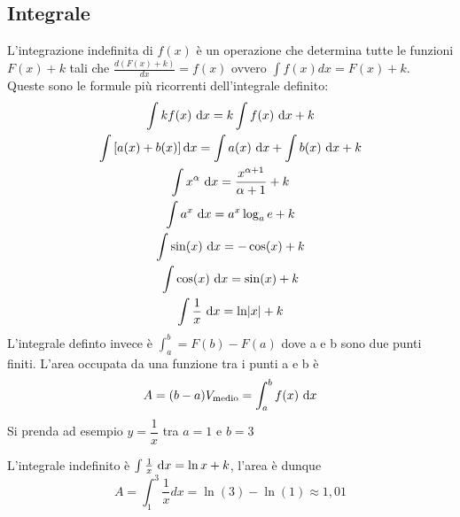 \subsection{Integrale}
L'integrazione indefinita di $f(x)$ è  un operazione che determina tutte le funzioni $F(x)+k$ tali 
che $\frac{d(F(x)+k)}{dx}=f(x)$ ovvero $\int f(x)dx = F(x)+k$.\\
Queste sono le formule più ricorrenti dell'integrale definito: 
\begin{gather*}
  \int kf(x)\,\dif x=k \int f(x)\,\dif x+k\\ 
  \int\left[a(x)+b(x)\right] \dif x= \int a(x)\,\dif x + \int b(x)\,\dif x+k\\
  \int x^{\alpha}\,\dif x =\frac{x^{\alpha+1}}{\alpha+1}+k \\
  \int a^{x}\,\dif x=a^{x}\log_{a}e+k\\
  \int \sin(x)\,\dif x = -\cos(x)+k\\
  \int \cos(x)\,\dif x = \sin(x)+k\\
  \int \frac{1}{x}\,\dif x= \ln \abs{x}+k 
\end{gather*}
L'integrale definto invece è $\int_{a}^{b}=F(b)-F(a)$ dove a e b sono due punti finiti. 
L'area occupata da una funzione tra i punti a e b è 
\begin{equation*}
  A=(b-a)V_{\text{medio}}=\int_{a}^{b}f(x)\,\mathop{}\!\mathrm{d} x
\end{equation*}
Si prenda ad esempio $y=\dfrac{1}{x}$ tra $a=1$ e $b=3$ 
\begin{center}
\end{center}
L'integrale indefinito è $\int \frac{1}{x}\,\mathop{}\!\mathrm{d} x=\ln x+k$, l'area è dunque 
\begin{equation*}
  A=\int_{1}^{3} \frac{1}{x} dx =\ln(3)-\ln(1) \approx 1,01
\end{equation*}
